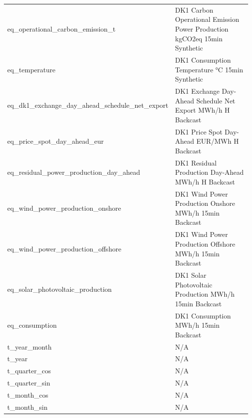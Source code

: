 \begin{xltabular}{\textwidth}{lX}
    eq\_operational\_carbon\_emission\_t                 & DK1 Carbon Operational Emission Power Production kgCO2eq 15min Synthetic \\
    eq\_temperature                                      & DK1 Consumption Temperature °C 15min Synthetic                           \\
    eq\_dk1\_exchange\_day\_ahead\_schedule\_net\_export & DK1 Exchange Day-Ahead Schedule Net Export MWh/h H Backcast              \\
    eq\_price\_spot\_day\_ahead\_eur                     & DK1 Price Spot Day-Ahead EUR/MWh H Backcast                              \\
    eq\_residual\_power\_production\_day\_ahead          & DK1 Residual Production Day-Ahead MWh/h H Backcast                       \\
    eq\_wind\_power\_production\_onshore                 & DK1 Wind Power Production Onshore MWh/h 15min Backcast                   \\
    eq\_wind\_power\_production\_offshore                & DK1 Wind Power Production Offshore MWh/h 15min Backcast                  \\
    eq\_solar\_photovoltaic\_production                  & DK1 Solar Photovoltaic Production MWh/h 15min Backcast                   \\
    eq\_consumption                                      & DK1 Consumption MWh/h 15min Backcast                                     \\
    t\_year\_month                                       & N/A                                                                      \\
    t\_year                                              & N/A                                                                      \\
    t\_quarter\_cos                                      & N/A                                                                      \\
    t\_quarter\_sin                                      & N/A                                                                      \\
    t\_month\_cos                                        & N/A                                                                      \\
    t\_month\_sin                                        & N/A                                                                      \\

\end{xltabular}
